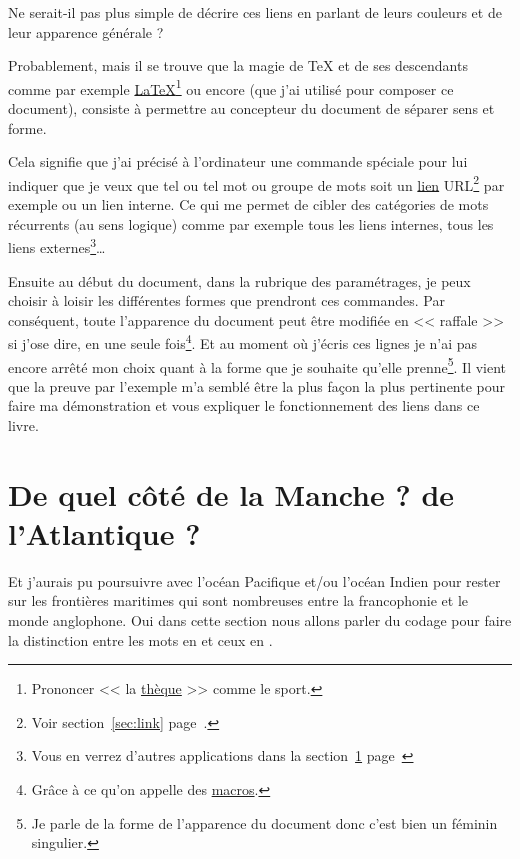 Ne serait-il pas plus simple de décrire ces liens en parlant de leurs
couleurs et de leur apparence générale ?

Probablement, mais il se trouve que la magie de \TeX{} et de ses
descendants comme par exemple
\href{https://fr.wikipedia.org/wiki/LaTeX}{\LaTeX}\footnote{Prononcer
  << la
  \href{https://fr.wikipedia.org/wiki/Th\%C3\%A8que_(sport)}{thèque}
  >> comme le sport.} ou encore 
\href{https://en.wikipedia.org/wiki/XeTeX}{\XeLaTeX} (que j'ai utilisé
pour composer ce document), consiste à
permettre au concepteur du document de séparer sens et forme. 

Cela signifie que j'ai précisé à l'ordinateur une commande spéciale
pour lui indiquer que je veux que tel ou tel mot ou groupe de mots
soit un \hyperlink{url}{lien} URL\footnote{Voir section~\ref{sec:link}
  page~\pageref{sec:link}.} par exemple ou un lien interne. Ce qui me
permet de cibler des catégories de mots récurrents (au sens logique)
comme par exemple tous les liens internes, tous les liens
externes\footnote{Vous en verrez d'autres applications dans la
  section~\ref{sec:side} page~\pageref{sec:side}}\dots 

Ensuite au début du document, dans la rubrique des paramétrages, je
peux choisir à loisir les différentes formes que prendront ces
commandes. Par conséquent, toute l'apparence du document peut être
modifiée en << raffale >> si j'ose dire, en une seule
fois\footnote{Grâce à ce qu'on appelle des \href{http://www.tuteurs.ens.fr/logiciels/latex/macros.html}{macros}.}. Et au
moment où j'écris ces lignes je n'ai pas encore arrêté mon choix quant
à la forme que je souhaite qu'elle prenne\footnote{Je parle de la
  forme de l'apparence du document donc c'est bien un féminin
  singulier.}. Il vient que la preuve par l'exemple m'a semblé être la
plus façon la plus pertinente pour faire ma démonstration et vous
expliquer le fonctionnement des liens dans ce livre.

\newpage

\section{De quel côté de la Manche ? de l'Atlantique ?}\label{sec:side}

Et j'aurais pu poursuivre avec l'océan Pacifique et/ou l'océan Indien
pour rester sur les frontières maritimes qui sont nombreuses entre la
francophonie et le monde anglophone. Oui dans cette section nous
allons parler du codage pour faire la distinction entre les mots en
 et ceux en .

